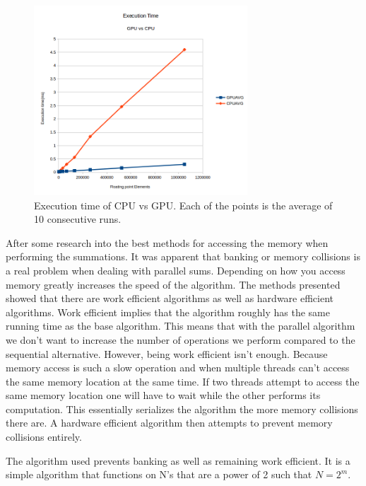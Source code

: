 \documentclass[letterpaper,twocolumn]{article}
\begin{document}
\begin{figure}
  \centering
  \includegraphics[width=8cm]{execution_time.png}
  \caption{Execution time of CPU vs GPU. Each of the points is the average of 10 consecutive runs.}
  \label{fig:execution_time}
\end{figure}
After some research into the best methods for accessing the memory when performing the summations. It was apparent that banking or memory collisions is a real problem when dealing with parallel sums. Depending on how you access memory greatly increases the speed of the algorithm. The methods presented showed that there are work efficient algorithms as well as hardware efficient algorithms. Work efficient implies that the algorithm roughly has the same running time as the base algorithm. This means that with the parallel algorithm we don't want to increase the number of operations we perform compared to the sequential alternative. However, being work efficient isn't enough. Because memory access is such a slow operation and when multiple threads can't access the same memory location at the same time. If two threads attempt to access the same memory location one will have to wait while the other performs its computation. This essentially serializes the algorithm the more memory collisions there are. A hardware efficient algorithm then attempts to prevent memory collisions entirely.

The algorithm used prevents banking as well as remaining work efficient. It is a simple algorithm that functions on N's that are a power of 2 such that $N=2^m$.
\end{document}
